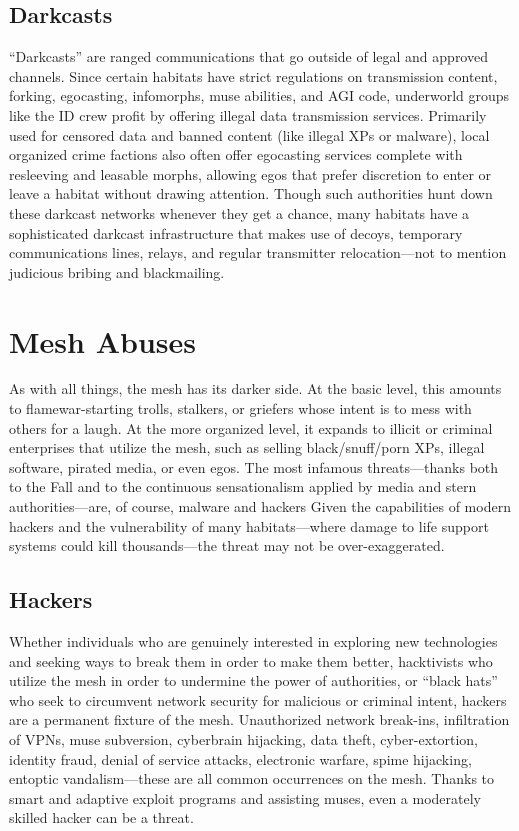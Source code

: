 \subsection{Darkcasts}

``Darkcasts'' are ranged communications that go outside
of legal and approved channels. Since certain habitats
have strict regulations on transmission content,
forking, egocasting, infomorphs, muse abilities, and 
AGI code, underworld groups like the ID crew profit 
by offering illegal data transmission services. Primarily 
used for censored data and banned content (like illegal 
XPs or malware), local organized crime factions also 
often offer egocasting services complete with resleeving
and leasable morphs, allowing egos that prefer
discretion to enter or leave a habitat without drawing 
attention. Though such authorities hunt down these 
darkcast networks whenever they get a chance, many 
habitats have a sophisticated darkcast infrastructure 
that makes use of decoys, temporary communications 
lines, relays, and regular transmitter relocation—not 
to mention judicious bribing and blackmailing.

\section{Mesh Abuses}

As with all things, the mesh has its darker side. At 
the basic level, this amounts to flamewar-starting 
trolls, stalkers, or griefers whose intent is to mess 
with others for a laugh. At the more organized level, 
it expands to illicit or criminal enterprises that utilize 
the mesh, such as selling black/snuff/porn XPs, illegal
software, pirated media, or even egos. The most
infamous threats—thanks both to the Fall and to 
the continuous sensationalism applied by media and 
stern authorities—are, of course, malware and hackers
Given the capabilities of modern hackers and the
vulnerability of many habitats—where damage to life 
support systems could kill thousands—the threat may 
not be over-exaggerated.

\subsection{Hackers}

Whether individuals who are genuinely interested 
in exploring new technologies and seeking ways to 
break them in order to make them better, hacktivists
who utilize the mesh in order to undermine the
power of authorities, or ``black hats'' who seek to 
circumvent network security for malicious or criminal
intent, hackers are a permanent fixture of the
mesh. Unauthorized network break-ins, infiltration 
of VPNs, muse subversion, cyberbrain hijacking, data 
theft, cyber-extortion, identity fraud, denial of service 
attacks, electronic warfare, spime hijacking, entoptic 
vandalism—these are all common occurrences on the 
mesh. Thanks to smart and adaptive exploit programs 
and assisting muses, even a moderately skilled hacker 
can be a threat.

